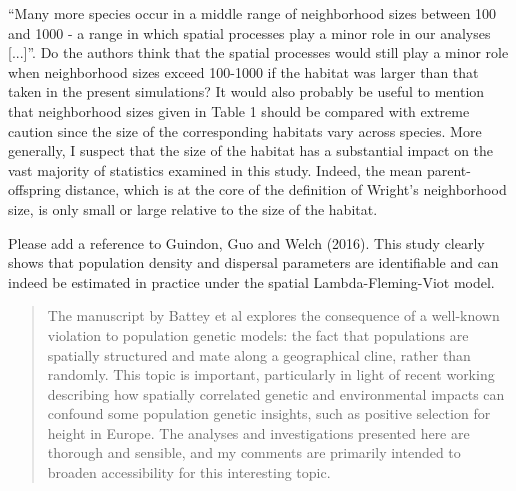 \begin{point}{\revref}
    ``Many more species occur in a middle range of neighborhood sizes between 100 and 1000 - a range in which spatial processes play a minor role in our analyses [...]''. Do the authors think that the spatial processes would still play a minor role when neighborhood sizes exceed 100-1000 if the habitat was larger than that taken in the present simulations? It would also probably be useful to mention that neighborhood sizes given in Table 1 should be compared with extreme caution since the size of the corresponding habitats vary across species. More generally, I suspect that the size of the habitat has a substantial impact on the vast majority of statistics examined in this study. Indeed, the mean parent-offspring distance, which is at the core of the definition of Wright's neighborhood size, is only small or large relative to the size of the habitat.
\end{point}


\begin{point}{\revref}
    Please add a reference to Guindon, Guo and Welch (2016). This study clearly shows that population density and dispersal parameters are identifiable and can indeed be estimated in practice under the spatial Lambda-Fleming-Viot model.
\end{point}





\begin{quote}
    The manuscript by Battey et al explores the consequence of a well-known
    violation to population genetic models: the fact that populations are
    spatially structured and mate along a geographical cline, rather than
    randomly. This topic is important, particularly in light of recent working
    describing how spatially correlated genetic and environmental impacts can
    confound some population genetic insights, such as positive selection for
    height in Europe. The analyses and investigations presented here are
    thorough and sensible, and my comments are primarily intended to broaden
    accessibility for this interesting topic.
\end{quote}

